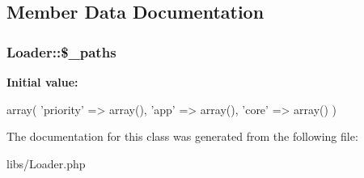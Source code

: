 \subsection{Member Data Documentation}
\hypertarget{classLoader_ab18d27798c939ce8bd22c0146e129071}{
\subsubsection[{\$\_\-paths}]{\setlength{\rightskip}{0pt plus 5cm}Loader::\$\_\-paths}}
\label{classLoader_ab18d27798c939ce8bd22c0146e129071}
{\bfseries Initial value:}
\begin{DoxyCode}
 array(
                        'priority' => array(),
                        'app' => array(),
                        'core' => array()
                )
\end{DoxyCode}


The documentation for this class was generated from the following file:\begin{DoxyCompactItemize}
\item 
libs/Loader.php\end{DoxyCompactItemize}
